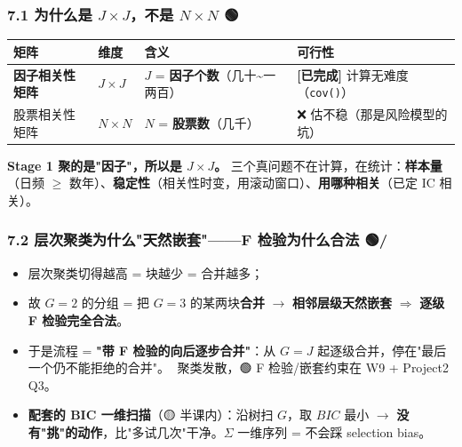 \documentclass[11pt]{article}
\begin{document}
\subsubsection{\texorpdfstring{7.1 为什么是 $J\times J$，不是 $N\times N$ 🟢}{7.1 为什么是 JtimesJ，不是 NtimesN 🟢}}
{\small
\begin{longtable}{p{3.28cm}p{1.27cm}p{6.37cm}p{5.28cm}}
\toprule
矩阵 & 维度 & 含义 & 可行性 \\
\midrule
\textbf{因子相关性矩阵} & $J\times J$ & $J$ = \textbf{因子个数}（几十\textasciitilde{}一两百） & \textbf{[已完成]} 计算无难度（\texttt{cov()}） \\
股票相关性矩阵 & $N\times N$ & $N$ = \textbf{股票数}（几千） & ❌ 估不稳（那是风险模型的坑） \\
\bottomrule
\end{longtable}
}
\textbf{Stage 1 聚的是"因子"，所以是 $J\times J$。} 三个真问题不在计算，在统计：\textbf{样本量}（日频 \ensuremath{\ge} 数年）、\textbf{稳定性}（相关性时变，用滚动窗口）、\textbf{用哪种相关}（已定 IC 相关）。
\subsubsection{\texorpdfstring{7.2 层次聚类为什么"天然嵌套"------F 检验为什么合法 🟢/🔴}{7.2 层次聚类为什么"天然嵌套"——F 检验为什么合法 🟢/🔴}}
\begin{itemize}
  \item 层次聚类切得越高 = 块越少 = 合并越多；
  \item 故 $G=2$ 的分组 = 把 $G=3$ 的某两块\textbf{合并} \ensuremath{\rightarrow} \textbf{相邻层级天然嵌套} \ensuremath{\Longrightarrow} \textbf{逐级 F 检验完全合法}。
  \item 于是流程 = \textbf{"带 F 检验的向后逐步合并"}：从 $G=J$ 起逐级合并，停在"最后一个仍不能拒绝的合并"。🔴 聚类发散，🟢 F 检验/嵌套约束在 W9 + Project2 Q3。
  \item \textbf{配套的 BIC 一维扫描}（🟡 半课内）：沿树扫 $G$，取 $BIC$ 最小 \ensuremath{\rightarrow} \textbf{没有"挑"的动作}，比"多试几次"干净。$\Sigma$ 一维序列 = 不会踩 selection bias。
\end{itemize}
\end{document}
